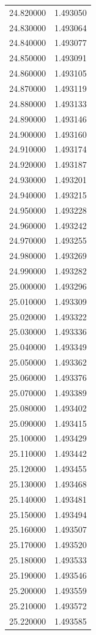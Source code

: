 \begin{tabular}{rr}
24.820000 & 1.493050 \\
24.830000 & 1.493064 \\
24.840000 & 1.493077 \\
24.850000 & 1.493091 \\
24.860000 & 1.493105 \\
24.870000 & 1.493119 \\
24.880000 & 1.493133 \\
24.890000 & 1.493146 \\
24.900000 & 1.493160 \\
24.910000 & 1.493174 \\
24.920000 & 1.493187 \\
24.930000 & 1.493201 \\
24.940000 & 1.493215 \\
24.950000 & 1.493228 \\
24.960000 & 1.493242 \\
24.970000 & 1.493255 \\
24.980000 & 1.493269 \\
24.990000 & 1.493282 \\
25.000000 & 1.493296 \\
25.010000 & 1.493309 \\
25.020000 & 1.493322 \\
25.030000 & 1.493336 \\
25.040000 & 1.493349 \\
25.050000 & 1.493362 \\
25.060000 & 1.493376 \\
25.070000 & 1.493389 \\
25.080000 & 1.493402 \\
25.090000 & 1.493415 \\
25.100000 & 1.493429 \\
25.110000 & 1.493442 \\
25.120000 & 1.493455 \\
25.130000 & 1.493468 \\
25.140000 & 1.493481 \\
25.150000 & 1.493494 \\
25.160000 & 1.493507 \\
25.170000 & 1.493520 \\
25.180000 & 1.493533 \\
25.190000 & 1.493546 \\
25.200000 & 1.493559 \\
25.210000 & 1.493572 \\
25.220000 & 1.493585 \\

\end{tabular}
